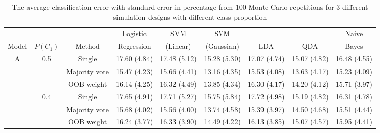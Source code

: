 \documentclass[eng]{csam}
\begin{document}
\begin{table}[ht]
	\footnotesize
	\caption{The average classification error with standard error in percentage from 100 Monte Carlo repetitions for 3 different simulation designs with different class proportion}
	\tabcolsep=4.5pt
	\begin{tabular}{cccrrrrrr}
		\hline\hline
		      &          &        & \multicolumn{1}{c}{Logistic} & \multicolumn{1}{c}{SVM} & \multicolumn{1}{c}{SVM} & & & \multicolumn{1}{c}{Naive} \\
		Model & $P(C_1)$ & Method & \multicolumn{1}{c}{Regression} & \multicolumn{1}{c}{(Linear)} & \multicolumn{1}{c}{(Gaussian)} & \multicolumn{1}{c}{LDA} & \multicolumn{1}{c}{QDA} & \multicolumn{1}{c}{Bayes} \\ 
		\hline
		\multirow{12}{*}{A} & \multirow{3}{*}{0.5} & Single        & 17.60 (4.84) & 17.48 (5.12) & 15.28 (5.30) & 17.07 (4.74) & 15.07 (4.82) & 16.48 (4.55) \\ 
						    &					  & Majority vote & 15.47 (4.23) & 15.66 (4.41) & 13.16 (4.35) & 15.53 (4.08) & 13.63 (4.17) & 15.23 (4.09) \\ 
						    &					  & OOB weight    & 16.14 (4.25) & 16.32 (4.49) & 13.85 (4.34) & 16.30 (4.17) & 14.20 (4.12) & 15.71 (3.97) \\ 
		\cline{2-9}
		& \multirow{3}{*}{0.4} & Single        & 17.65 (4.91) & 17.71 (5.27) & 15.75 (5.84) & 17.72 (4.98) & 15.19 (4.82) & 16.31 (4.78) \\
		&					   & Majority vote & 15.68 (4.02) & 15.56 (4.00) & 13.74 (4.58) & 15.39 (3.97) & 14.50 (4.68) & 15.51 (4.44) \\ 
		&					   & OOB weight    & 16.24 (3.77) & 16.33 (3.90) & 14.49 (4.22) & 16.13 (3.85) & 15.07 (4.57) & 15.95 (4.41) \\ 
		

\end{tabular}
\end{table}
\end{document}
